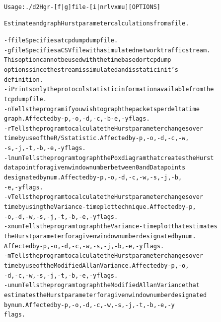 \begin{alltt}
\label{verb:help}
Usage: ./d2Hgr -[f|g] file -[i|nrlvxmu] [OPTIONS]                               

Estimate and graph Hurst parameter calculations from a file.

   -f file   Specifies a tcpdump dump file.
   -g file   Specifies a CSV file with a simulated network traffic stream.
             This option cannot be used with the time based or tcpdump
             options since the stream is simulated and is static in it's
             definition.
   -i        Prints only the protocol statistic information available from the
             tcpdump file.
   -n        Tells the program if you wish to graph the packets per delta time
             graph. Affected by -p, -o, -d, -c, -b -e, -y flags.
   -r        Tells the program to calculate the Hurst parameter changes over
             time by use of the R/S statistic. Affected by -p, -o, -d, -c, -w,
             -s, -j, -t, -b, -e, -y flags.
   -l num    Tells the program to graph the Pox diagram that creates the Hurst
             data point for a given window number between 0 and Datapoints
             designated by num. Affected by -p, -o, -d, -c, -w, -s, -j, -b,
             -e, -y flags.
   -v        Tells the program to calculate the Hurst parameter changes over
             time by using the Variance-time plot technique. Affected by -p,
             -o, -d, -w, -s, -j, -t, -b, -e, -y flags.
   -x num    Tells the program to graph the Variance-time plot that estimates
             the Hurst parameter for a given window number designated by num.
             Affected by -p, -o, -d, -c, -w, -s, -j, -b, -e, -y flags.
   -m        Tells the program to calculate the Hurst parameter changes over
             time by use of the Modified Allan Variance. Affected by -p, -o,
             -d, -c, -w, -s, -j, -t, -b, -e, -y flags.
   -u num    Tells the program to graph the Modified Allan Variance that
             estimates the Hurst parameter for a given window number designated
             by num. Affected by -p, -o, -d, -c, -w, -s, -j, -t, -b, -e, -y
             flags.


\end{alltt}
